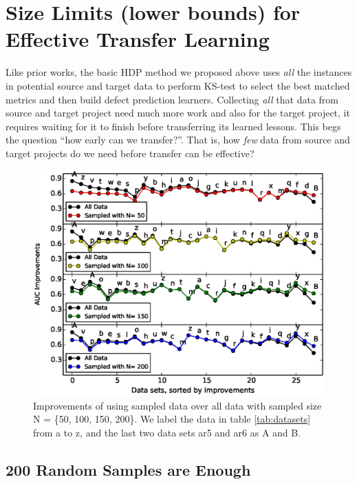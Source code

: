 
\section{Size Limits (lower bounds) for Effective Transfer Learning}
\label{sec:sizelimit}

Like prior works\cite{nam2013transfer,
  ma2012transfer, rahman2012recalling, ryu2014value,
  zhang2014towards}, the basic HDP method we
proposed above uses {\em all} the instances in potential source and target data to
perform KS-test to select the best matched metrics and then build
defect prediction learners.
Collecting {\em all} that data from source and target project need much more work and also
for the target project, it requires waiting for it to finish before
transferring its learned lessons. This begs the question ``how early can we transfer?''.
That is, how {\em few} data from source and target projects do we need before transfer can be effective?

\begin{figure}[t]
	\centering
	\includegraphics[width=\linewidth]{Figures/raleigh/sample_random.eps}
	\caption{Improvements of using sampled data over all data with sampled size N = \{50, 100, 150, 200\}. We label the data in table \ref{tab:datasets} from a to z, and the last two data sets ar5 and ar6 as A and B.}
	\label{fig:small_data}
\end{figure}


\subsection{200 Random Samples are Enough}

